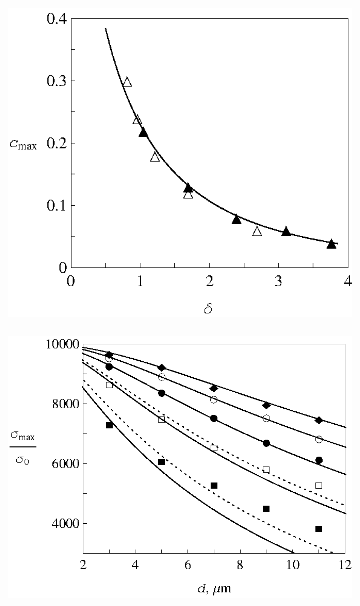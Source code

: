 \documentclass[14pt,twoside]{vakthesis}
\begin{document}
\begin{figure}[tb]
	\centering
	\begin{subfigure}[c]{0.45\textwidth}
		\includegraphics[width=\textwidth]{Siekierski_MaximumLocation.eps}
		\caption{} \label{fig:simulations-max-1layer2005-a}
	\end{subfigure}
	\quad
	\begin{subfigure}[c]{0.51\textwidth}
		\includegraphics[width=\textwidth]{Siekierski_MaxConductivity.eps}
		\caption{} \label{fig:simulations-max-1layer2005-b}
	\end{subfigure}

\end{figure}
\end{document}

